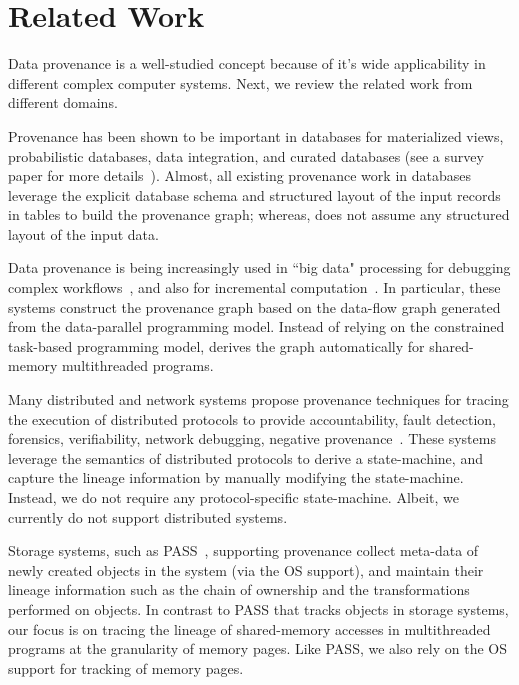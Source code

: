 \section{Related Work}
\label{sec:related}





Data provenance is a well-studied concept because of it's wide applicability in different complex computer systems. Next, we review the related work from different domains.






 Provenance has been shown to be important in databases for materialized views, probabilistic databases, data integration, and curated databases (see a survey paper for more details~\cite{provenance-database-tutorial}). Almost, all existing provenance work in databases leverage the explicit database schema and structured layout of the input records in tables to build the provenance graph; whereas, \projecttitle does not assume any structured layout of the input data.


 
 Data provenance is being increasingly used in ``big data"  processing for  debugging complex workflows~\cite{nova, conductor-nsdi-2012, conductor-ladis-2010, conductor-podc-2010}, and also for incremental computation~\cite{incoop, slider, incoop-hotcloud, incApprox, contraction-tree, shredder, Bhatotia15}.  In particular, these systems construct the provenance graph based on the data-flow graph generated from the data-parallel programming model. 
Instead of relying on the constrained task-based programming model,  \projecttitle derives the graph automatically for shared-memory multithreaded programs.


 Many distributed and network systems propose provenance techniques for tracing the  execution of distributed protocols to provide accountability, fault detection, forensics, verifiability, network debugging, negative provenance~\cite{ wu-2014-negative-provenance, snp, dtap}. 
These systems leverage the semantics of distributed protocols to derive a state-machine, and capture the lineage information by manually modifying the state-machine. Instead, we do not require any protocol-specific state-machine. Albeit, we currently do not support distributed systems.




 Storage systems, such as PASS~\cite{pass-atc}, supporting provenance collect meta-data of newly created objects in the system (via the OS support), 
and  maintain their lineage information such as the chain of ownership and the transformations performed on objects. In contrast to PASS that tracks objects in storage systems,  our focus is on tracing the lineage of shared-memory accesses in multithreaded programs at the granularity of memory pages. Like PASS, we also rely on the OS support for tracking of memory pages.


